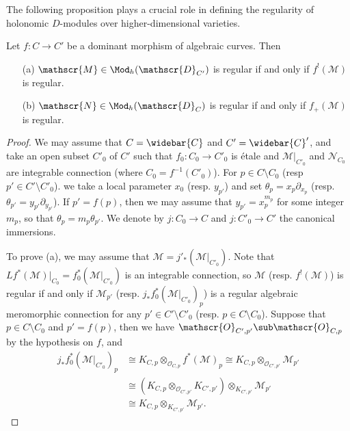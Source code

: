 The following proposition plays a crucial role in defining the regularity of holonomic $D$-modules over higher-dimensional varieties.

\begin{proposition}\label{D-module holonomic on curve regular and functor}
Let $f:C\to C'$ be a dominant morphism of algebraic curves. Then
\begin{enumerate}
    \item[(a)] $\mathscr{M}\in\Mod_h(\mathscr{D}_{C'})$ is regular if and only if $f^!(\mathscr{M})$ is regular.
    \item[(b)] $\mathscr{N}\in\Mod_h(\mathscr{D}_{C})$ is regular if and only if $f_+(\mathscr{M})$ is regular. 
\end{enumerate}
\end{proposition}
\begin{proof}
We may assume that $C=\widebar{C}$ and $C'=\widebar{C}'$, and take an open subset $C'_0$ of $C'$ such that $f_0:C_0\to C'_0$ is \'etale and $\mathscr{M}|_{C'_0}$ and $\mathscr{N}_{C_0}$ are integrable connection (where $C_0=f^{-1}(C'_0)$). For $p\in C\setminus C_0$ (resp $p'\in C'\setminus C'_0$). we take a local parameter $x_0$ (resp. $y_{p'}$) and set $\theta_p=x_p\partial_{x_p}$ (resp. $\theta_{p'}=y_{p'}\partial_{y_{p'}}$). If $p'=f(p)$, then we may assume that $y_{p'}=x_p^{m_p}$ for some integer $m_p$, so that $\theta_p=m_p\theta_{p'}$. We denote by $j:C_0\to C$ and $j:C'_0\to C'$ the canonical immersions.\par
To prove (a), we may assume that $\mathscr{M}=j'_*(\mathscr{M}|_{C'_0})$. Note that $Lf^*(\mathscr{M})|_{C_0}=f_0^*(\mathscr{M}|_{C'_0})$ is an integrable connection, so $\mathscr{M}$ (resp. $f^!(\mathscr{M})$) is regular if and only if $\mathscr{M}_{p'}$ (resp. $j_*f_0^*(\mathscr{M}|_{C'_0})_p$) is a regular algebraic meromorphic connection for any $p'\in C'\setminus C'_0$ (resp. $p\in C\setminus C_0$). Suppose that $p\in C\setminus C_0$ and $p'=f(p)$, then we have $\mathscr{O}_{C',p'}\sub\mathscr{O}_{C,p}$ by the hypothesis on $f$, and
\begin{align*}
j_*f_0^*(\mathscr{M}|_{C'_0})_p&\cong K_{C,p}\otimes_{\mathscr{O}_{C,p}}f^*(\mathscr{M})_p\cong K_{C,p}\otimes_{\mathscr{O}_{C',p'}}\mathscr{M}_{p'}\\
&\cong (K_{C,p}\otimes_{\mathscr{O}_{C',p'}}K_{C',p'})\otimes_{K_{C',p'}}\mathscr{M}_{p'}\\
&\cong K_{C,p}\otimes_{K_{C',p'}}\mathscr{M}_{p'}.
\end{align*}

\end{proof}

